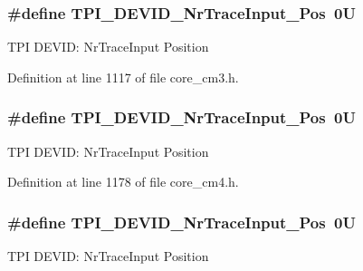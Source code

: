 \subsubsection[{\texorpdfstring{T\+P\+I\+\_\+\+D\+E\+V\+I\+D\+\_\+\+Nr\+Trace\+Input\+\_\+\+Pos}{TPI_DEVID_NrTraceInput_Pos}}]{\setlength{\rightskip}{0pt plus 5cm}\#define T\+P\+I\+\_\+\+D\+E\+V\+I\+D\+\_\+\+Nr\+Trace\+Input\+\_\+\+Pos~0U}\hypertarget{group___c_m_s_i_s___t_p_i_ga80ecae7fec479e80e583f545996868ed}{}\label{group___c_m_s_i_s___t_p_i_ga80ecae7fec479e80e583f545996868ed}
T\+PI D\+E\+V\+ID\+: Nr\+Trace\+Input Position 

Definition at line 1117 of file core\+\_\+cm3.\+h.

\subsubsection[{\texorpdfstring{T\+P\+I\+\_\+\+D\+E\+V\+I\+D\+\_\+\+Nr\+Trace\+Input\+\_\+\+Pos}{TPI_DEVID_NrTraceInput_Pos}}]{\setlength{\rightskip}{0pt plus 5cm}\#define T\+P\+I\+\_\+\+D\+E\+V\+I\+D\+\_\+\+Nr\+Trace\+Input\+\_\+\+Pos~0U}\hypertarget{group___c_m_s_i_s___t_p_i_ga80ecae7fec479e80e583f545996868ed}{}\label{group___c_m_s_i_s___t_p_i_ga80ecae7fec479e80e583f545996868ed}
T\+PI D\+E\+V\+ID\+: Nr\+Trace\+Input Position 

Definition at line 1178 of file core\+\_\+cm4.\+h.

\subsubsection[{\texorpdfstring{T\+P\+I\+\_\+\+D\+E\+V\+I\+D\+\_\+\+Nr\+Trace\+Input\+\_\+\+Pos}{TPI_DEVID_NrTraceInput_Pos}}]{\setlength{\rightskip}{0pt plus 5cm}\#define T\+P\+I\+\_\+\+D\+E\+V\+I\+D\+\_\+\+Nr\+Trace\+Input\+\_\+\+Pos~0U}\hypertarget{group___c_m_s_i_s___t_p_i_ga80ecae7fec479e80e583f545996868ed}{}\label{group___c_m_s_i_s___t_p_i_ga80ecae7fec479e80e583f545996868ed}
T\+PI D\+E\+V\+ID\+: Nr\+Trace\+Input Position 

